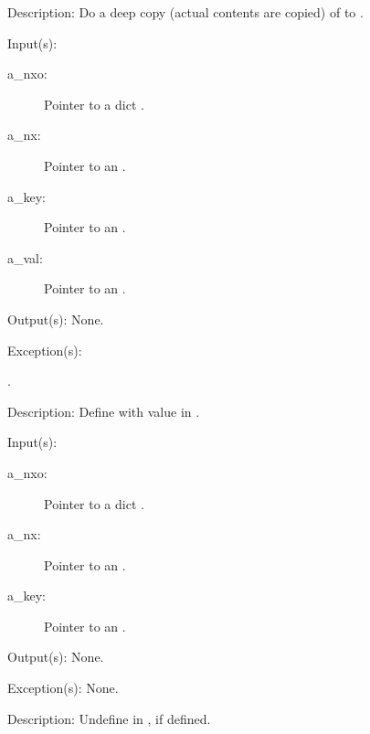 \begin{capi}
\begin{capilist}
\begin{description}
		\end{description}
	\item[Description: ]
		Do a deep copy (actual contents are copied) of  to
		.
	\end{capilist}
\label{nxo_dict_def}
	\begin{capilist}
	\item[Input(s): ]
		\begin{description}\item[]
		\item[a\_nxo: ]
			Pointer to a dict .
		\item[a\_nx: ]
			Pointer to an .
		\item[a\_key: ]
			Pointer to an .
		\item[a\_val: ]
			Pointer to an .
		\end{description}
	\item[Output(s): ] None.
	\item[Exception(s): ]
		\begin{description}\item[]
		\item[.]
		\end{description}
	\item[Description: ]
		Define  with value  in .
	\end{capilist}
\label{nxo_dict_undef}
	\begin{capilist}
	\item[Input(s): ]
		\begin{description}\item[]
		\item[a\_nxo: ]
			Pointer to a dict \classname{nxo}.
		\item[a\_nx: ]
			Pointer to an \classname{nx}.
		\item[a\_key: ]
			Pointer to an \classname{nxo}.
		\end{description}
	\item[Output(s): ] None.
	\item[Exception(s): ] None.
	\item[Description: ]
		Undefine  in , if defined.

\end{capilist}
\end{capi}
